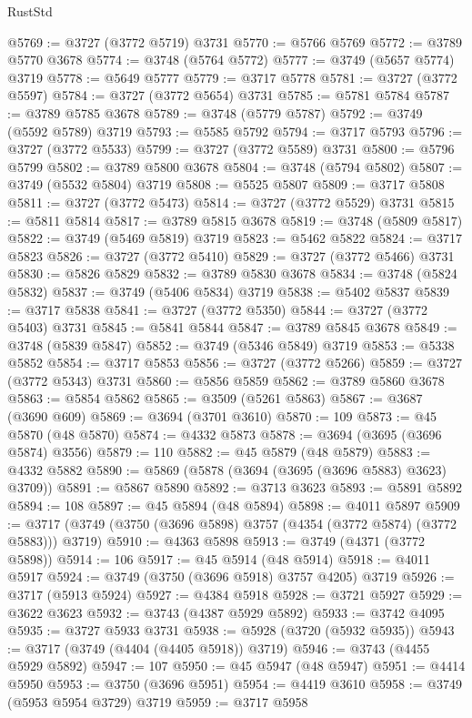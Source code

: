 \begin{lexlean}{RustStd}
\begin{coremodule}
@5769 := @3727 (@3772 @5719) @3731
@5770 := @5766 @5769
@5772 := @3789 @5770 @3678
@5774 := @3748 (@5764 @5772)
@5777 := @3749 (@5657 @5774) @3719
@5778 := @5649 @5777
@5779 := @3717 @5778
@5781 := @3727 (@3772 @5597)
@5784 := @3727 (@3772 @5654) @3731
@5785 := @5781 @5784
@5787 := @3789 @5785 @3678
@5789 := @3748 (@5779 @5787)
@5792 := @3749 (@5592 @5789) @3719
@5793 := @5585 @5792
@5794 := @3717 @5793
@5796 := @3727 (@3772 @5533)
@5799 := @3727 (@3772 @5589) @3731
@5800 := @5796 @5799
@5802 := @3789 @5800 @3678
@5804 := @3748 (@5794 @5802)
@5807 := @3749 (@5532 @5804) @3719
@5808 := @5525 @5807
@5809 := @3717 @5808
@5811 := @3727 (@3772 @5473)
@5814 := @3727 (@3772 @5529) @3731
@5815 := @5811 @5814
@5817 := @3789 @5815 @3678
@5819 := @3748 (@5809 @5817)
@5822 := @3749 (@5469 @5819) @3719
@5823 := @5462 @5822
@5824 := @3717 @5823
@5826 := @3727 (@3772 @5410)
@5829 := @3727 (@3772 @5466) @3731
@5830 := @5826 @5829
@5832 := @3789 @5830 @3678
@5834 := @3748 (@5824 @5832)
@5837 := @3749 (@5406 @5834) @3719
@5838 := @5402 @5837
@5839 := @3717 @5838
@5841 := @3727 (@3772 @5350)
@5844 := @3727 (@3772 @5403) @3731
@5845 := @5841 @5844
@5847 := @3789 @5845 @3678
@5849 := @3748 (@5839 @5847)
@5852 := @3749 (@5346 @5849) @3719
@5853 := @5338 @5852
@5854 := @3717 @5853
@5856 := @3727 (@3772 @5266)
@5859 := @3727 (@3772 @5343) @3731
@5860 := @5856 @5859
@5862 := @3789 @5860 @3678
@5863 := @5854 @5862
@5865 := @3509 (@5261 @5863)
@5867 := @3687 (@3690 @609)
@5869 := @3694 (@3701 @3610)
@5870 := 109
@5873 := @45 @5870 (@48 @5870)
@5874 := @4332 @5873
@5878 := @3694 (@3695 (@3696 @5874) @3556)
@5879 := 110
@5882 := @45 @5879 (@48 @5879)
@5883 := @4332 @5882
@5890 := @5869 (@5878 (@3694 (@3695 (@3696 @5883) @3623) @3709))
@5891 := @5867 @5890
@5892 := @3713 @3623
@5893 := @5891 @5892
@5894 := 108
@5897 := @45 @5894 (@48 @5894)
@5898 := @4011 @5897
@5909 := @3717 (@3749 (@3750 (@3696 @5898) @3757 (@4354 (@3772 @5874) (@3772 @5883))) @3719)
@5910 := @4363 @5898
@5913 := @3749 (@4371 (@3772 @5898))
@5914 := 106
@5917 := @45 @5914 (@48 @5914)
@5918 := @4011 @5917
@5924 := @3749 (@3750 (@3696 @5918) @3757 @4205) @3719
@5926 := @3717 (@5913 @5924)
@5927 := @4384 @5918
@5928 := @3721 @5927
@5929 := @3622 @3623
@5932 := @3743 (@4387 @5929 @5892)
@5933 := @3742 @4095
@5935 := @3727 @5933 @3731
@5938 := @5928 (@3720 (@5932 @5935))
@5943 := @3717 (@3749 (@4404 (@4405 @5918)) @3719)
@5946 := @3743 (@4455 @5929 @5892)
@5947 := 107
@5950 := @45 @5947 (@48 @5947)
@5951 := @4414 @5950
@5953 := @3750 (@3696 @5951)
@5954 := @4419 @3610
@5958 := @3749 (@5953 @5954 @3729) @3719
@5959 := @3717 @5958

\end{coremodule}
\end{lexlean}
